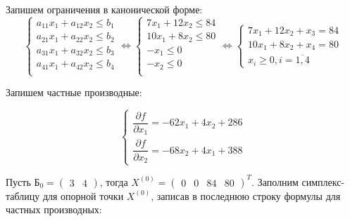 Запишем ограничения в канонической форме:
\begin{equation*}
\begin{cases}
a_{11} x_1 + a_{12} x_2 \leq b_1 \\
a_{21} x_1 + a_{22} x_2 \leq b_2 \\
a_{31} x_1 + a_{32} x_2 \leq b_3 \\
a_{41} x_1 + a_{42} x_2 \leq b_4 \\
\end{cases}
\Longleftrightarrow
\begin{cases}
7 x_1 + 12 x_2 \leq 84 \\
10 x_1 + 8 x_2 \leq 80 \\
-x_1 \leq 0 \\
-x_2 \leq 0 \\
\end{cases}
\Longleftrightarrow
\begin{cases}
7 x_1 + 12 x_2 + x_3 = 84 \\
10 x_1 + 8 x_2 + x_4 = 80 \\
x_i \geq 0, i = \overline{1,4}
\end{cases}
\end{equation*}

Запишем частные производные:

\begin{equation*}
\begin{cases}
\dfrac{\partial f}{\partial x_1} = -62 x_1 + 4 x_2 + 286 \\
\dfrac{\partial f}{\partial x_2} = -68 x_2 + 4 x_1 + 388
\end{cases}
\end{equation*}

Пусть $\text{Б}_0 = \begin{pmatrix} 3 & 4 \end{pmatrix}$, тогда $X^{(0)} = \begin{pmatrix} 0 & 0 & 84 & 80 \end{pmatrix}^T$. Заполним симплекс-таблицу для опорной точки $X^{(0)}$, записав в последнюю строку формулы для частных производных:

